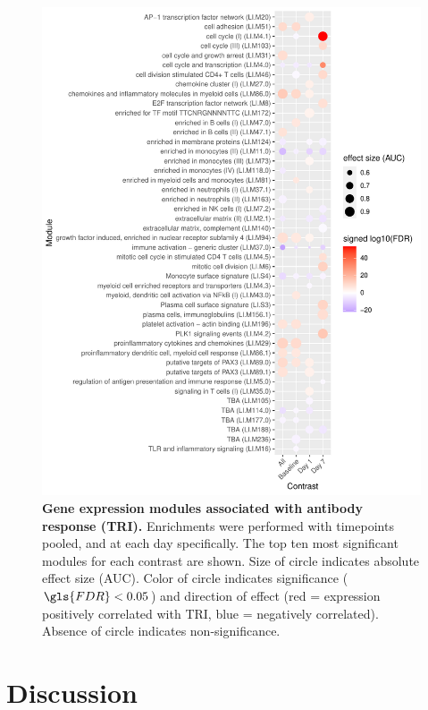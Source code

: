 \begin{figure}
    \includegraphics[width=1.0\textwidth]{mainmatter/figures/chapter_02/compare_dge_eqtl.tmodDotPlot.DGE.TRI.pdf}
    \caption{
        \textbf{Gene expression modules associated with antibody response (\gls{TRI}).}
        Enrichments were performed with timepoints pooled, and at each day specifically.
        The top ten most significant modules for each contrast are shown.
        Size of circle indicates absolute effect size (\gls{AUC}). 
        Color of circle indicates significance ($\gls{FDR} < 0.05$) and direction of effect (red = expression positively correlated with TRI, blue = negatively correlated).
        Absence of circle indicates non-significance.
    }
    \label{fig:hird_tmodDotPlot_TRI}
\end{figure}

\section{Discussion}

